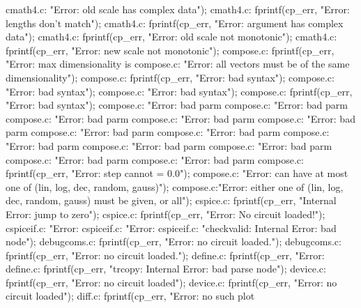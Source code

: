 {{{{{{cmath4.c:                    "Error: old scale has complex data\n");
cmath4.c:        fprintf(cp_err, "Error: lengths don't match\n");
cmath4.c:        fprintf(cp_err, "Error: argument has complex data\n");
cmath4.c:            fprintf(cp_err, "Error: old scale not monotonic\n");
cmath4.c:            fprintf(cp_err, "Error: new scale not monotonic\n");
compose.c:            fprintf(cp_err, "Error: max dimensionality is %
compose.c:        "Error: all vectors must be of the same dimensionality\n");
compose.c:                    fprintf(cp_err, "Error: bad syntax\n");
compose.c:                            "Error: bad syntax\n");
compose.c:                            "Error: bad syntax\n");
compose.c:                    fprintf(cp_err, "Error: bad syntax\n");
compose.c:                        "Error: bad parm %
compose.c:                        "Error: bad parm %
compose.c:                        "Error: bad parm %
compose.c:                        "Error: bad parm %
compose.c:                        "Error: bad parm %
compose.c:                        "Error: bad parm %
compose.c:                        "Error: bad parm %
compose.c:                        "Error: bad parm %
compose.c:                        "Error: bad parm %
compose.c:                        "Error: bad parm %
compose.c:                        "Error: bad parm %
compose.c:                        "Error: bad parm %
compose.c:            fprintf(cp_err, "Error: step cannot = 0.0\n");
compose.c:    "Error: can have at most one of (lin, log, dec, random, gauss)\n");
compose.c:"Error: either one of (lin, log, dec, random, gauss) must be given, or all\n");
cspice.c:        fprintf(cp_err, "Internal Error: jump to zero\n");
cspice.c:            fprintf(cp_err, "Error: No circuit loaded!\n");
cspiceif.c:                    "Error: %
cspiceif.c:                        "Error: %
cspiceif.c:                "checkvalid: Internal Error: bad node\n");
debugcoms.c:        fprintf(cp_err, "Error: no circuit loaded.\n");
debugcoms.c:        fprintf(cp_err, "Error: no circuit loaded.\n");
define.c:            fprintf(cp_err, "Error: %
define.c:        fprintf(cp_err, "trcopy: Internal Error: bad parse node\n");
device.c:        fprintf(cp_err, "Error: no circuit loaded\n");
device.c:        fprintf(cp_err, "Error: no circuit loaded\n");
diff.c:                fprintf(cp_err, "Error: no such plot %
}}}}}}
